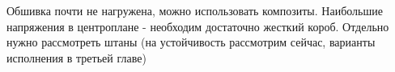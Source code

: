 

Обшивка почти не нагружена, можно использовать композиты. Наибольшие напряжения в центроплане - необходим достаточно жесткий короб. Отдельно нужно рассмотреть штаны (на устойчивость рассмотрим сейчас, варианты исполнения в третьей главе) 



%
